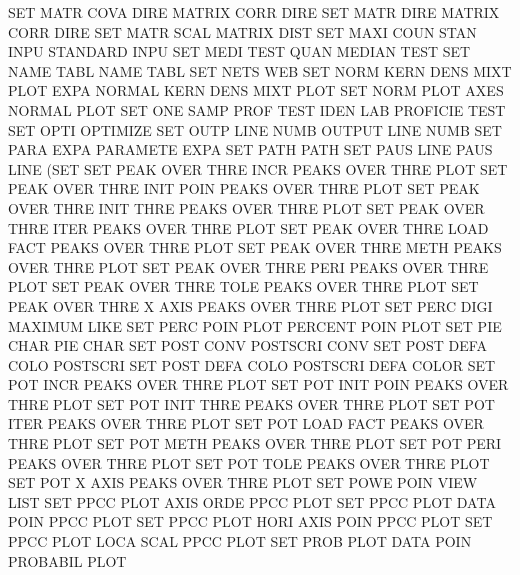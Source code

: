 SET      MATR COVA DIRE                 MATRIX   CORR DIRE
SET      MATR DIRE                      MATRIX   CORR DIRE
SET      MATR SCAL                      MATRIX   DIST
SET      MAXI COUN STAN INPU            STANDARD INPU
SET      MEDI TEST QUAN                 MEDIAN   TEST
SET      NAME TABL                      NAME     TABL
SET      NETS                           WEB
SET      NORM KERN DENS MIXT PLOT EXPA  NORMAL   KERN DENS MIXT PLOT
SET      NORM PLOT AXES                 NORMAL   PLOT
SET      ONE  SAMP PROF TEST IDEN LAB   PROFICIE TEST
SET      OPTI                           OPTIMIZE
SET      OUTP LINE NUMB                 OUTPUT   LINE NUMB
SET      PARA EXPA                      PARAMETE EXPA
SET      PATH                           PATH
SET      PAUS LINE                      PAUS     LINE (SET
SET      PEAK OVER THRE INCR            PEAKS    OVER THRE PLOT
SET      PEAK OVER THRE INIT POIN       PEAKS    OVER THRE PLOT
SET      PEAK OVER THRE INIT THRE       PEAKS    OVER THRE PLOT
SET      PEAK OVER THRE ITER            PEAKS    OVER THRE PLOT
SET      PEAK OVER THRE LOAD FACT       PEAKS    OVER THRE PLOT
SET      PEAK OVER THRE METH            PEAKS    OVER THRE PLOT
SET      PEAK OVER THRE PERI            PEAKS    OVER THRE PLOT
SET      PEAK OVER THRE TOLE            PEAKS    OVER THRE PLOT
SET      PEAK OVER THRE X    AXIS       PEAKS    OVER THRE PLOT
SET      PERC DIGI                      MAXIMUM  LIKE
SET      PERC POIN PLOT                 PERCENT  POIN PLOT
SET      PIE  CHAR                      PIE      CHAR
SET      POST CONV                      POSTSCRI CONV
SET      POST DEFA COLO                 POSTSCRI
SET      POST DEFA COLO                 POSTSCRI DEFA COLOR
SET      POT  INCR                      PEAKS    OVER THRE PLOT
SET      POT  INIT POIN                 PEAKS    OVER THRE PLOT
SET      POT  INIT THRE                 PEAKS    OVER THRE PLOT
SET      POT  ITER                      PEAKS    OVER THRE PLOT
SET      POT  LOAD FACT                 PEAKS    OVER THRE PLOT
SET      POT  METH                      PEAKS    OVER THRE PLOT
SET      POT  PERI                      PEAKS    OVER THRE PLOT
SET      POT  TOLE                      PEAKS    OVER THRE PLOT
SET      POT  X    AXIS                 PEAKS    OVER THRE PLOT
SET      POWE POIN VIEW                 LIST
SET      PPCC PLOT AXIS ORDE            PPCC     PLOT
SET      PPCC PLOT DATA POIN            PPCC     PLOT
SET      PPCC PLOT HORI AXIS POIN       PPCC     PLOT
SET      PPCC PLOT LOCA SCAL            PPCC     PLOT
SET      PROB PLOT DATA POIN            PROBABIL PLOT

